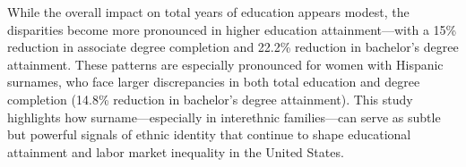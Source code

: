 While the overall impact on total years of education appears modest, the disparities become more pronounced in higher education attainment—with a 15\% reduction in associate degree completion and 22.2\% reduction in bachelor's degree attainment. These patterns are especially pronounced for women with Hispanic surnames, who face larger discrepancies in both total education and degree completion (14.8\% reduction in bachelor's degree attainment). This study highlights how surname---especially in interethnic families---can serve as subtle but powerful signals of ethnic identity that continue to shape educational attainment and labor market inequality in the United States.